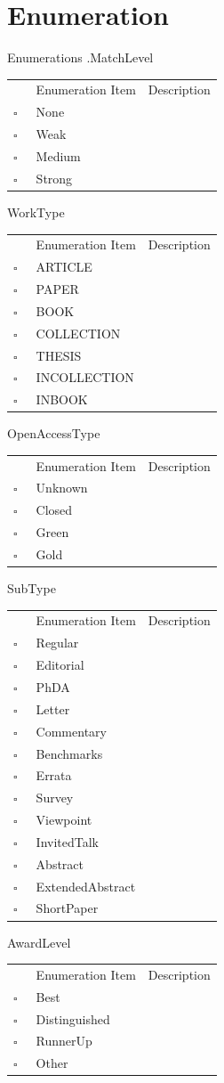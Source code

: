 \chapter{Enumeration}
Enumerations     .MatchLevel   
\begin{longtable}{llp{8cm}}
& Enumeration Item & Description \\
$\square$\ & None &  \\
$\square$\ & Weak &  \\
$\square$\ & Medium &  \\
$\square$\ & Strong &  \\
\end{longtable}
WorkType   
\begin{longtable}{llp{8cm}}
& Enumeration Item & Description \\
$\square$\ & ARTICLE &  \\
$\square$\ & PAPER &  \\
$\square$\ & BOOK &  \\
$\square$\ & COLLECTION &  \\
$\square$\ & THESIS &  \\
$\square$\ & INCOLLECTION &  \\
$\square$\ & INBOOK &  \\
\end{longtable}
OpenAccessType   
\begin{longtable}{llp{8cm}}
& Enumeration Item & Description \\
$\square$\ & Unknown &  \\
$\square$\ & Closed &  \\
$\square$\ & Green &  \\
$\square$\ & Gold &  \\
\end{longtable}
SubType   
\begin{longtable}{llp{8cm}}
& Enumeration Item & Description \\
$\square$\ & Regular &  \\
$\square$\ & Editorial &  \\
$\square$\ & PhDA &  \\
$\square$\ & Letter &  \\
$\square$\ & Commentary &  \\
$\square$\ & Benchmarks &  \\
$\square$\ & Errata &  \\
$\square$\ & Survey &  \\
$\square$\ & Viewpoint &  \\
$\square$\ & InvitedTalk &  \\
$\square$\ & Abstract &  \\
$\square$\ & ExtendedAbstract &  \\
$\square$\ & ShortPaper &  \\
\end{longtable}
AwardLevel   
\begin{longtable}{llp{8cm}}
& Enumeration Item & Description \\
$\square$\ & Best &  \\
$\square$\ & Distinguished &  \\
$\square$\ & RunnerUp &  \\
$\square$\ & Other &  \\
\end{longtable}
